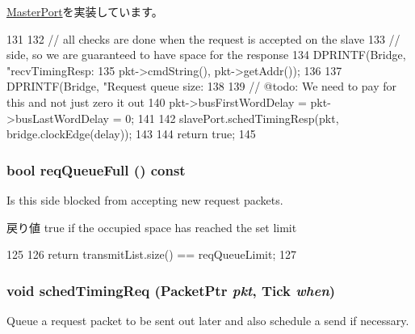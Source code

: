 \hyperlink{classMasterPort_abd323548d6c93f8b0543f1fe3a86ca35}{MasterPort}を実装しています。


\begin{DoxyCode}
131 {
132     // all checks are done when the request is accepted on the slave
133     // side, so we are guaranteed to have space for the response
134     DPRINTF(Bridge, "recvTimingResp: %
135             pkt->cmdString(), pkt->getAddr());
136 
137     DPRINTF(Bridge, "Request queue size: %
138 
139     // @todo: We need to pay for this and not just zero it out
140     pkt->busFirstWordDelay = pkt->busLastWordDelay = 0;
141 
142     slavePort.schedTimingResp(pkt, bridge.clockEdge(delay));
143 
144     return true;
145 }
\end{DoxyCode}
\hypertarget{classBridge_1_1BridgeMasterPort_a5b40b3c494ce10f0e9f0c89965808030}{
\subsubsection[{reqQueueFull}]{\setlength{\rightskip}{0pt plus 5cm}bool reqQueueFull () const}}
\label{classBridge_1_1BridgeMasterPort_a5b40b3c494ce10f0e9f0c89965808030}
Is this side blocked from accepting new request packets.

\begin{DoxyReturn}{戻り値}
true if the occupied space has reached the set limit 
\end{DoxyReturn}



\begin{DoxyCode}
125 {
126     return transmitList.size() == reqQueueLimit;
127 }
\end{DoxyCode}
\hypertarget{classBridge_1_1BridgeMasterPort_a6e835b0c02fcb4679fc14de7605b4f13}{
\subsubsection[{schedTimingReq}]{\setlength{\rightskip}{0pt plus 5cm}void schedTimingReq ({\bf PacketPtr} {\em pkt}, \/  {\bf Tick} {\em when})}}
\label{classBridge_1_1BridgeMasterPort_a6e835b0c02fcb4679fc14de7605b4f13}
Queue a request packet to be sent out later and also schedule a send if necessary.


